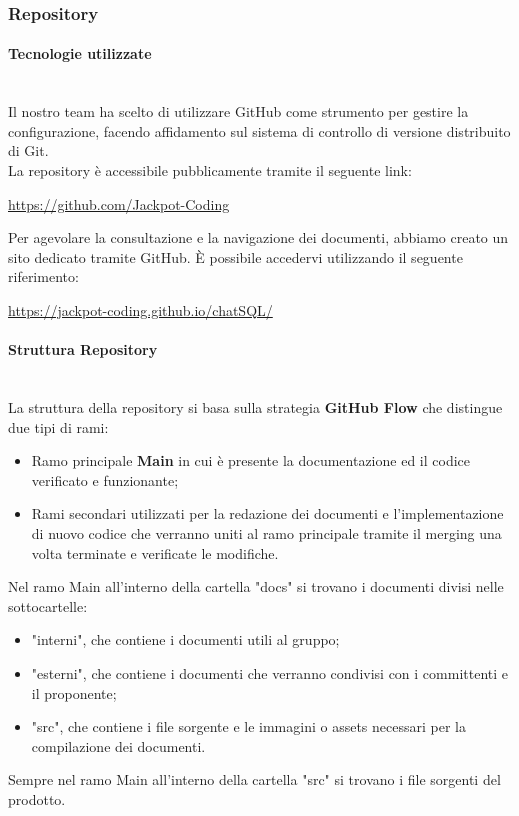 \documentclass{article}
\begin{document}
    \subsubsection{Repository}
    \paragraph{Tecnologie utilizzate}~\\
    Il nostro team ha scelto di utilizzare GitHub come strumento per gestire la configurazione, facendo affidamento sul sistema di controllo di versione distribuito di Git.\\
    La repository è accessibile pubblicamente tramite il seguente link:
    \begin{center}
    \url{https://github.com/Jackpot-Coding}\\
    \end{center}
    Per agevolare la consultazione e la navigazione dei documenti, abbiamo creato un sito dedicato tramite GitHub. È possibile accedervi utilizzando il seguente riferimento:
    \begin{center}
    \url{https://jackpot-coding.github.io/chatSQL/}\\
    \end{center}
    \paragraph{Struttura Repository}~\\
    La struttura della repository si basa sulla strategia \textbf{GitHub Flow} che distingue due tipi di rami:
    \begin{itemize}
    	\item Ramo principale \textbf{Main} in cui è presente la documentazione ed il codice verificato e funzionante;
    	\item Rami secondari utilizzati per la redazione dei documenti e l'implementazione di nuovo codice che verranno uniti al ramo principale tramite il merging una volta terminate e verificate le modifiche.
    \end{itemize}
    Nel ramo Main all'interno della cartella "docs" si trovano i documenti divisi nelle sottocartelle:
    \begin{itemize}
    	\item "interni", che contiene i documenti utili al gruppo;
    	\item "esterni", che contiene i documenti che verranno condivisi con i committenti e il proponente;
    	\item "src", che contiene i file sorgente e le immagini o assets necessari per la compilazione dei documenti.
    \end{itemize}
    Sempre nel ramo Main all'interno della cartella "src" si trovano i file sorgenti del prodotto.
    
\end{document}
